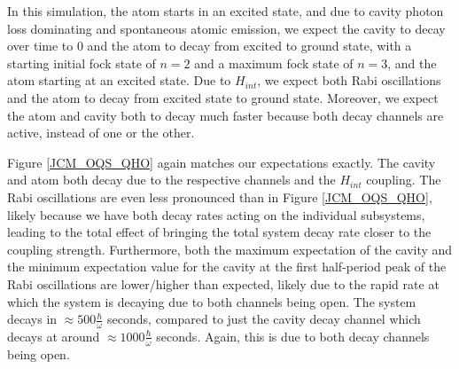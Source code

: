 \documentclass[12pt]{article}
\begin{document}
In this simulation, the atom starts in an excited state, and due to cavity photon loss dominating and spontaneous atomic emission, we expect the cavity to decay over time to 0 and the atom to decay from excited to ground state, with a starting initial fock state of $n=2$ and a maximum fock state of $n=3$, and the atom starting at an excited state. Due to $H_{int}$, we expect both Rabi oscillations and the atom to decay from excited state to ground state. Moreover, we expect the atom and cavity both to decay much faster because both decay channels are active, instead of one or the other. 

Figure \ref{JCM_OQS_QHO} again matches our expectations exactly. The cavity and atom both decay due to the respective channels and the $H_{int}$ coupling. The Rabi oscillations are even less pronounced than in Figure \ref{JCM_OQS_QHO}, likely because we have both decay rates acting on the individual subsystems, leading to the total effect of bringing the total system decay rate closer to the coupling strength. Furthermore, both the maximum expectation of the cavity and the minimum expectation value for the cavity at the first half-period peak of the Rabi oscillations are lower/higher than expected, likely due to the rapid rate at which the system is decaying due to both channels being open. The system decays in $\approx 500 \frac{\hbar}{\omega}$ seconds, compared to just the cavity decay channel which decays at around $\approx 1000 \frac{\hbar}{\omega}$ seconds. Again, this is due to both decay channels being open.
\end{document}
